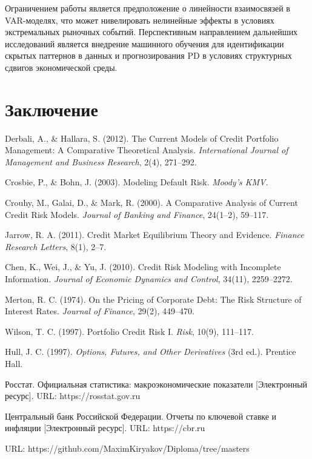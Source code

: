 \documentclass[]{article}
\begin{document}
	Ограничением работы является предположение о линейности взаимосвязей в VAR-моделях, что может нивелировать нелинейные эффекты в условиях экстремальных рыночных событий. Перспективным направлением дальнейших исследований является внедрение машинного обучения для идентификации скрытых паттернов в данных и прогнозирования PD в условиях структурных сдвигов экономической среды.
	
	
	\section{Заключение}
	
	
	\newpage
	\begin{thebibliography}{9}
		Derbali, A., \& Hallara, S. (2012). The Current Models of Credit Portfolio Management: A Comparative Theoretical Analysis. \textit{International Journal of Management and Business Research}, 2(4), 271–292.
		
		Crosbie, P., \& Bohn, J. (2003). Modeling Default Risk. \textit{Moody’s KMV}.
		
		Crouhy, M., Galai, D., \& Mark, R. (2000). A Comparative Analysis of Current Credit Risk Models. \textit{Journal of Banking and Finance}, 24(1–2), 59–117.
		
		Jarrow, R. A. (2011). Credit Market Equilibrium Theory and Evidence. \textit{Finance Research Letters}, 8(1), 2–7.
		
		Chen, K., Wei, J., \& Yu, J. (2010). Credit Risk Modeling with Incomplete Information. \textit{Journal of Economic Dynamics and Control}, 34(11), 2259–2272.
		
		Merton, R. C. (1974). On the Pricing of Corporate Debt: The Risk Structure of Interest Rates. \textit{Journal of Finance}, 29(2), 449–470.
		
		Wilson, T. C. (1997). Portfolio Credit Risk I. \textit{Risk}, 10(9), 111–117.
		
		Hull, J. C. (1997). \textit{Options, Futures, and Other Derivatives} (3rd ed.). Prentice Hall.
		
		Росстат. Официальная статистика: макроэкономические показатели [Электронный ресурс]. URL: https://rosstat.gov.ru
		
		Центральный банк Российской Федерации. Отчеты по ключевой ставке и инфляции [Электронный ресурс]. URL: https://cbr.ru
		
		URL: https://github.com/MaximKiryakov/Diploma/tree/masters
		
	\end{thebibliography}
	

	
	
	
\end{document}
